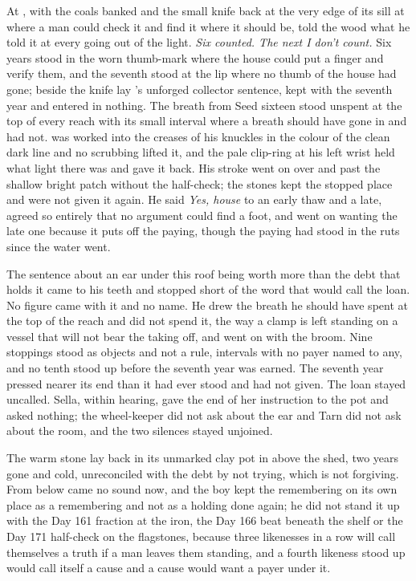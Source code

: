 At , with the coals banked and the small knife back at the very edge of its sill at  where a man could check it and find it where it should be,  told the wood what he told it at every going out of the light. \emph{Six counted. The next I don't count.} Six years stood in the worn thumb-mark where the house could put a finger and verify them, and the seventh stood at the lip where no thumb of the house had gone; beside the knife lay 's unforged collector sentence, kept with the seventh year and entered in nothing. The breath from Seed sixteen stood unspent at the top of every reach with its small interval where a breath should have gone in and had not.  was worked into the creases of his knuckles in the colour of the clean dark line and no scrubbing lifted it, and the pale clip-ring at his left wrist held what light there was and gave it back. His stroke went on over  and past the shallow bright patch without the half-check; the stones kept the stopped place and were not given it again. He said \emph{Yes, house} to an early thaw and a late, agreed so entirely that no argument could find a foot, and went on wanting the late one because it puts off the paying, though the paying had stood in the ruts since the water went.

The sentence about an ear under this roof being worth more than the debt that holds it came to his teeth and stopped short of the word that would call the loan. No figure came with it and no name. He drew the breath he should have spent at the top of the reach and did not spend it, the way a clamp is left standing on a vessel that will not bear the taking off, and went on with the broom. Nine stoppings stood as objects and not a rule, intervals with no payer named to any, and no tenth stood up before the seventh year was earned. The seventh year pressed nearer its end than it had ever stood and had not given. The loan stayed uncalled. Sella, within hearing, gave the end of her instruction to the pot and asked nothing; the wheel-keeper did not ask about the ear and Tarn did not ask about the room, and the two silences stayed unjoined.

The warm stone lay back in its unmarked clay pot in  above the shed, two years gone and cold, unreconciled with the debt by not trying, which is not forgiving. From below came no sound now, and the boy kept the remembering on its own place as a remembering and not as a holding done again; he did not stand it up with the Day 161 fraction at the iron, the Day 166 beat beneath the shelf or the Day 171 half-check on the flagstones, because three likenesses in a row will call themselves a truth if a man leaves them standing, and a fourth likeness stood up would call itself a cause and a cause would want a payer under it.

